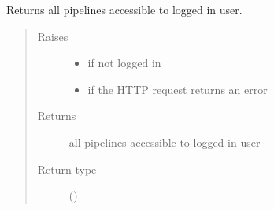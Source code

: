 \documentclass[letterpaper,10pt,english]{sphinxmanual}
\begin{document}
\begin{fulllineitems}
\begin{fulllineitems}
\begin{quote}
\begin{description}
\end{description}\end{quote}

\end{fulllineitems}


\begin{fulllineitems}
\label{\detokenize{autoapi/pine/client/client/index:pine.client.client.PineClient.get_pipelines}}
\sphinxAtStartPar
Returns all pipelines accessible to logged in user.
\begin{quote}\begin{description}
\item[{Raises}] \leavevmode\begin{itemize}
\item {} 
\sphinxAtStartPar
{\hyperref[\detokenize{autoapi/pine/client/exceptions/index:pine.client.exceptions.PineClientAuthException}]{}} \textendash{} if not logged in

\item {} 
\sphinxAtStartPar
{\hyperref[\detokenize{autoapi/pine/client/exceptions/index:pine.client.exceptions.PineClientHttpException}]{}} \textendash{} if the HTTP request returns an error

\end{itemize}

\item[{Returns}] \leavevmode
\sphinxAtStartPar
all pipelines accessible to logged in user

\item[{Return type}] \leavevmode
\sphinxAtStartPar
{}()

\end{description}\end{quote}

\end{fulllineitems}


\end{fulllineitems}
\end{document}
